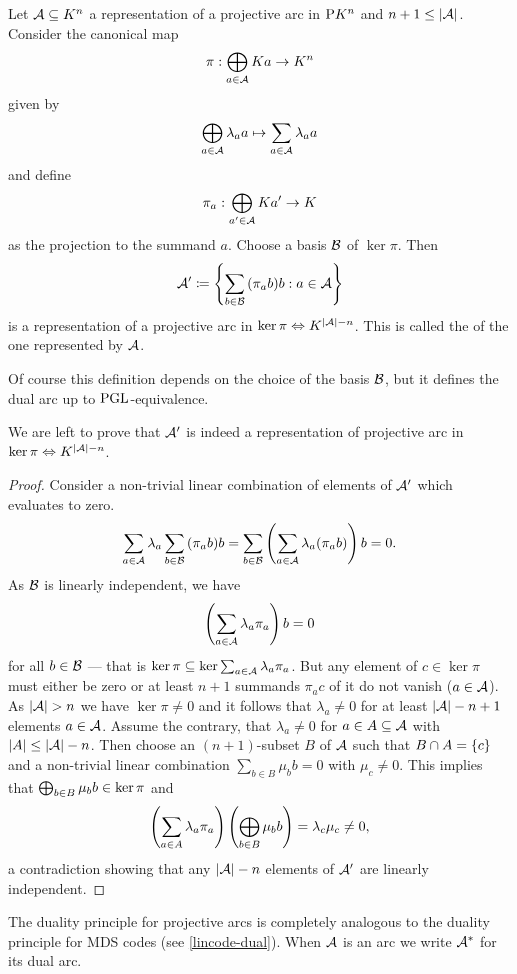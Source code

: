 \begin{definition}\label{def-dual-arc}
    Let $\mathcal{A}\subseteq K^n$ a representation of a projective arc in $\P K^n$ and $n+1\leq \left\vert{\mathcal{A}}\right\vert$. Consider the canonical map
    $$\pi:\bigoplus_{a\in\mathcal{A}}{Ka}\rightarrow K^n$$
    given by
    $$\bigoplus_{a\in\mathcal{A}}{\lambda_a a}\mapsto \sum_{a\in\mathcal{A}}{\lambda_a a}$$
    and define
    $$\pi_a:\bigoplus_{a'\in \mathcal{A}}{Ka'}\rightarrow K$$
    as the projection to the summand $a$.
    Choose a basis $\mathcal{B}$ of $\ker \pi$. Then
    $$
    \cA'\defeq\set{\sum_{b\in\cB}{(\pi_a b)b}}[a\in\cA]
    $$
    is a representation of a projective arc in $\ker \pi \iso K^{\card\cA -n}$.
    This is called the  of the one represented by $\mathcal{A}$.
\end{definition}
\begin{remark}
Of course this definition depends on the choice of the basis $\mathcal{B}$, but it defines the dual arc up to $\mathrm{PGL}$-equivalence.
\end{remark}

We are left to prove that $\mathcal{A}'$ is indeed a representation of projective arc in $\ker\pi\iso K^{\card\cA-n}$.

\begin{proof}    
Consider a non-trivial linear combination of elements of $\mathcal{A}'$ which evaluates to zero.
$$
\sum_{a\in\mathcal{A}}{\lambda_a\sum_{b\in\mathcal{B}}{(\pi_a b)b}}=\sum_{b\in\mathcal{B}}{\left(\sum_{a\in\mathcal{A}}{\lambda_a(\pi_a b)}\right)b}=0.
$$
As $\mathcal{B}$ is linearly independent, we have
$$
\left(\sum_{a\in\mathcal{A}}{\lambda_a\pi_a}\right)b=0
$$
for all $b\in\mathcal{B}$ --- that is $\ker\pi\subseteq \ker{\sum_{a\in\mathcal{A}}{\lambda_a\pi_a}}$. But any element of $c\in\ker \pi$ must either be zero or at least $n+1$ summands $\pi_a c$ of it do not vanish ($a\in \mathcal{A}$). As $\left\vert{\mathcal{A}}\right\vert>n$ we have $\ker\pi\neq 0$ and it follows that $\lambda_a\neq 0$ for at least $\left\vert{\mathcal{A}}\right\vert-n+1$ elements $a\in\mathcal{A}$. Assume the contrary, that $\lambda_a\neq 0$ for $a\in A\subseteq \mathcal{A}$ with $\left\vert{A}\right\vert\leq \left\vert{\mathcal{A}}\right\vert-n$. Then choose an $(n+1)$-subset $B$ of $\mathcal{A}$ such that $B\setmeet A=\set{c}$ and a non-trivial linear combination $\sum_{b\in B}{\mu_b b}=0$ with $\mu_c\neq 0$.
This implies that $\bigoplus_{b\in B}{\mu_b b}\in\ker \pi$ and
$$
\left(\sum_{a\in A}{\lambda_a\pi_a}\right)\left(\bigoplus_{b\in B}{\mu_b b}\right)=\lambda_c\mu_c\neq 0, 
$$
a contradiction showing that any $\left\vert{\mathcal{A}}\right\vert-n$ elements of $\mathcal{A}'$ are linearly independent.
\end{proof}

The duality principle for projective arcs is completely analogous to the duality principle for MDS codes (see \autoref{lincode-dual}).
When $\mathcal{A}$ is an arc we write ${\mathcal{A}}^{\ast}$ for its dual arc.

